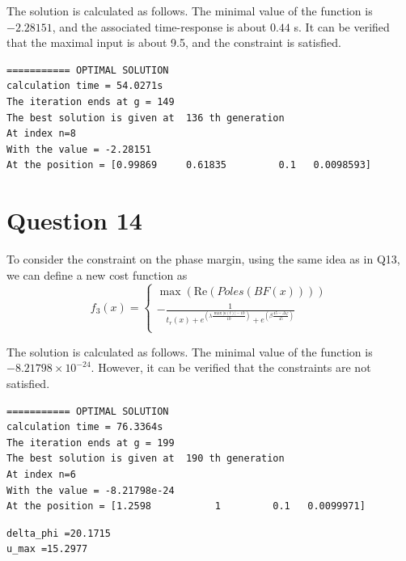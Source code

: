 \documentclass{CSArticle}[english]
\begin{document}
The solution is calculated as follows. The minimal value of the function is $-2.28151$, and the associated time-response is about $0.44$ s. It can be verified that the maximal input is about 9.5, and the constraint is satisfied.
\begin{lstlisting}[style=RESULT]
=========== OPTIMAL SOLUTION
calculation time = 54.0271s 
The iteration ends at g = 149 
The best solution is given at  136 th generation 
At index n=8 
With the value = -2.28151 
At the position = [0.99869     0.61835         0.1   0.0098593] 
\end{lstlisting}

\section{Question 14}
To consider the constraint on the phase margin, using the same idea as in Q13, we can define a new cost function as
\begin{equation}
    f_3\left( x \right) =\begin{cases}
	\max \left( \mathrm{Re}\left( Poles\left( BF\left( x \right) \right) \right) \right)\\
	-\frac{1}{t_r\left( x \right) +e^{\left( \lambda \frac{\max |u\left( t \right) |-10}{10} \right)}+e^{\left( \beta \frac{45-\Delta \varphi}{45} \right)}}\\
\end{cases}
\end{equation}

The solution is calculated as follows. The minimal value of the function is $-8.21798\times10^{-24} $. However, it can be verified that the constraints are not satisfied.
\begin{lstlisting}[style=RESULT]
=========== OPTIMAL SOLUTION
calculation time = 76.3364s 
The iteration ends at g = 199 
The best solution is given at  190 th generation 
At index n=6 
With the value = -8.21798e-24 
At the position = [1.2598           1         0.1   0.0099971]

\end{lstlisting}

\begin{lstlisting}[style=RESULT]
delta_phi =20.1715
u_max =15.2977
\end{lstlisting}
\end{document}
